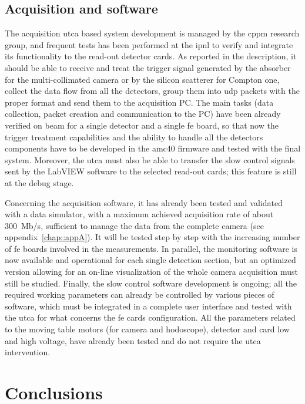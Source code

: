 \subsection{Acquisition and software}\label{chap3::subsec::daqNext}

The acquisition \gls{utca} based system development is managed by the \gls{cppm} research group, and frequent tests has been performed at the \gls{ipnl} to verify and integrate its functionality to the read-out detector cards. As reported in the description, it should be able to receive and treat the trigger signal generated by the absorber for the multi-collimated camera or by the silicon scatterer for Compton one, collect the data flow from all the detectors, group them into \gls{udp} packets with the proper format and send them to the acquisition PC. The main tasks (data collection, packet creation and communication to the PC) have been already verified on beam for a single detector and a single \gls{fe} board, so that now the trigger treatment capabilities and the ability to handle all the detectors components have to be developed in the \gls{amc}40 firmware and tested with the final system. Moreover, the \gls{utca} must also be able to transfer the slow control signals sent by the LabVIEW software to the selected read-out cards; this feature is still at the debug stage.

Concerning the acquisition software, it has already been tested and validated with a data simulator, with a maximum achieved acquisition rate of about 300~Mb/s, sufficient to manage the data from the complete camera (see appendix~\ref{chap::appA}). It will be tested step by step with the increasing number of \gls{fe} boards involved in the measurements. In parallel, the monitoring software is now available and operational for each single detection section, but an optimized version allowing for an on-line visualization of the whole camera acquisition must still be studied. Finally, the slow control software development is ongoing; all the required working parameters can already be controlled by various pieces of software, which must be integrated in a complete user interface and tested with the \gls{utca} for what concerns the \gls{fe} cards configuration. All the parameters related to the moving table motors (for camera and hodoscope), detector and card low and high voltage, have already been tested and do not require the \gls{utca} intervention.        

\section{Conclusions}\label{chap3::sec::conclusion}

